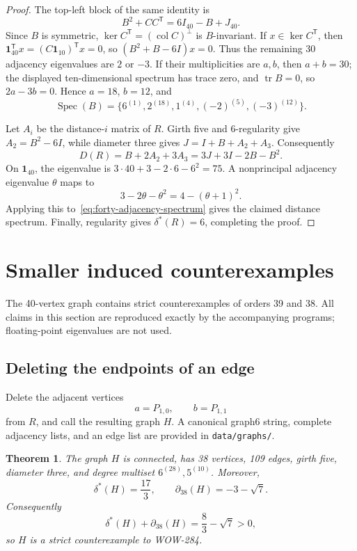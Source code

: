 \documentclass[a4paper,11pt,reqno]{amsart}
\theoremstyle{plain}
\newtheorem{theorem}{Theorem}[section]
\theoremstyle{definition}
\theoremstyle{remark}
\newcommand{\Spec}{\operatorname{Spec}}
\newcommand{\tr}{\operatorname{tr}}
\begin{document}
\begin{proof}
The top-left block of the same identity is
\[
 B^2+CC^{\mathsf T}=6I_{40}-B+J_{40}.
\]
Since \(B\) is symmetric, \(\ker C^{\mathsf T}=(\operatorname{col}C)^\perp\)
is \(B\)-invariant.  If \(x\in\ker C^{\mathsf T}\), then
\(\mathbf1_{40}^{\mathsf T}x=(C\mathbf1_{10})^{\mathsf T}x=0\), so
\((B^2+B-6I)x=0\).  Thus the remaining 30 adjacency eigenvalues are \(2\)
or \(-3\).  If their multiplicities are \(a,b\), then
\(a+b=30\); the displayed ten-dimensional spectrum has trace zero, and
\(\tr B=0\), so \(2a-3b=0\).  Hence \(a=18\), \(b=12\), and
\begin{equation}\label{eq:forty-adjacency-spectrum}
 \Spec(B)=\{6^{(1)},2^{(18)},1^{(4)},(-2)^{(5)},(-3)^{(12)}\}.
\end{equation}

Let \(A_i\) be the distance-\(i\) matrix of \(R\).  Girth five and
6-regularity give \(A_2=B^2-6I\), while diameter three gives
\(J=I+B+A_2+A_3\).  Consequently
\begin{equation}\label{eq:forty-distance-identity}
 D(R)=B+2A_2+3A_3=3J+3I-2B-B^2.
\end{equation}
On \(\mathbf1_{40}\), the eigenvalue is
\(3\cdot40+3-2\cdot6-6^2=75\).  A nonprincipal adjacency eigenvalue
\(\theta\) maps to
\[
 3-2\theta-\theta^2=4-(\theta+1)^2.
\]
Applying this to~\eqref{eq:forty-adjacency-spectrum} gives the claimed
distance spectrum.  Finally, regularity gives \(\delta^*(R)=6\), completing
the proof.
\end{proof}

\section{Smaller induced counterexamples}\label{sec:smaller}

The 40-vertex graph contains strict counterexamples of orders 39 and 38.
All claims in this section are reproduced exactly by the accompanying
programs; floating-point eigenvalues are not used.

\subsection{Deleting the endpoints of an edge}

Delete the adjacent vertices
\[
 a=P_{1,0},\qquad b=P_{1,1}
\]
from \(R\), and call the resulting graph \(H\).  A canonical graph6 string,
complete adjacency lists, and an edge list are provided in
\texttt{data/graphs/}.

\begin{theorem}\label{thm:thirty-eight}
The graph \(H\) is connected, has 38 vertices, 109 edges, girth five,
diameter three, and degree multiset \(6^{(28)},5^{(10)}\).  Moreover,
\[
 \delta^*(H)=\frac{17}{3},
 \qquad
 \partial_{38}(H)=-3-\sqrt7.
\]
Consequently
\[
 \delta^*(H)+\partial_{38}(H)=\frac83-\sqrt7>0,
\]
so \(H\) is a strict counterexample to WOW-284.
\end{theorem}
\end{document}
